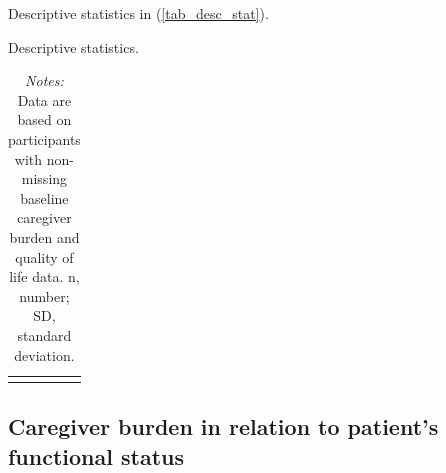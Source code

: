 \documentclass[12pt]{article}
\begin{document}

Descriptive statistics in (\autoref{tab_desc_stat}). 

\hspace{1em}
\begin{table}[H]
    \centering \singlespacing \small
    \caption{Descriptive statistics.}
    \begin{tabular}{|L{5cm}|R{3.2cm}|}
        \hline
    \end{tabular}
    \label{tab_desc_stat}
    \caption*{\footnotesize \textit{Notes:} Data are based on participants with non-missing baseline caregiver burden and quality of life data. n, number; SD, standard deviation.
}
\end{table}

\subsection{Caregiver burden in relation to patient's functional status}
\end{document}
